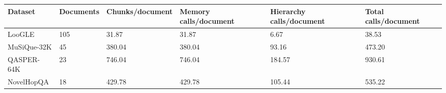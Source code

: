 \begin{tabular}{llllll}
\hline
Dataset & Documents & Chunks/document & Memory calls/document & Hierarchy calls/document & Total calls/document \\
\hline
LooGLE & 105 & 31.87 & 31.87 & 6.67 & 38.53 \\
MuSiQue-32K & 45 & 380.04 & 380.04 & 93.16 & 473.20 \\
QASPER-64K & 23 & 746.04 & 746.04 & 184.57 & 930.61 \\
NovelHopQA & 18 & 429.78 & 429.78 & 105.44 & 535.22 \\
\hline
\end{tabular}
